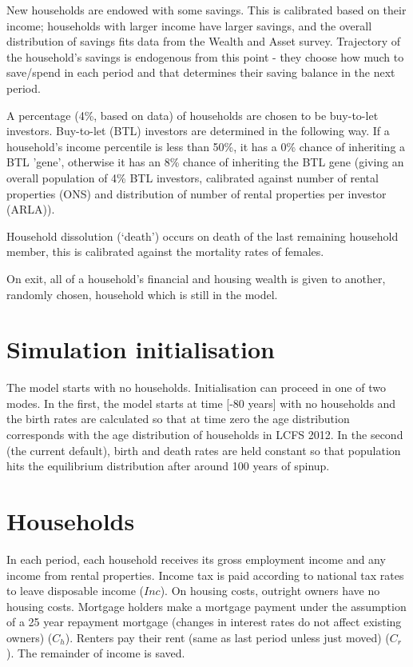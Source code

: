 \documentclass{article}
\begin{document}
New households are endowed with some savings. This is calibrated based on
their income; households with larger income have larger savings, and the
overall distribution of savings fits data from the Wealth and Asset survey.
Trajectory of the household's savings is endogenous from this point - they
choose how much to save/spend in each period and that determines their
saving balance in the next period.

A percentage (4\%, based on data) of households are chosen to be
buy-to-let investors. Buy-to-let (BTL) investors are determined in the
following way. If a household's income percentile is less than 50\%, it has
a 0\% chance of inheriting a BTL 'gene', otherwise it has an 8\% chance of
inheriting the BTL gene (giving an overall population of 4\% BTL investors,
calibrated against number of rental properties (ONS) and distribution of
number of rental properties per investor (ARLA)).

Household dissolution (`death') occurs on death of
the last remaining household member, this is calibrated against the mortality rates of
females.

On exit, all of a household's financial and housing wealth is given to
another, randomly chosen, household which is still in the model.

\section{Simulation initialisation}

The model starts  with no households. Initialisation can proceed in one of two modes. In the first, the model starts at time [-80 years] with no households and the birth rates are calculated so that at time zero the age distribution corresponds with the age distribution of households in LCFS 2012. In the second (the current default), birth and death rates are held constant so that population hits the equilibrium distribution after around 100 years of spinup.

\section{Households}

In each period, each household receives its gross employment income and any
income from rental properties. Income tax is paid according to national tax
rates to leave disposable income ($Inc$). On housing costs, outright owners
have no housing costs. Mortgage holders make a mortgage payment under the
assumption of a 25 year repayment mortgage (changes in interest rates do not affect
existing owners) ($C_{h}$). Renters pay their rent (same as last period
unless just moved) ($C_{r}$). The remainder of income is saved.
\end{document}
